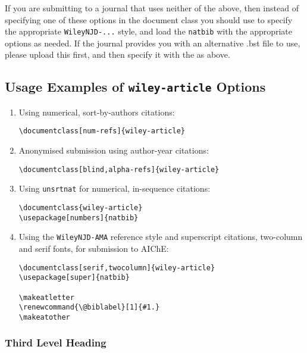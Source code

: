 If you are submitting to a journal that uses neither of the above, then instead of specifying one of these options in the document class you should use  \verb|| to specify the appropriate \verb|WileyNJD-...| style, and load the \verb|natbib| with the appropriate options as needed. If the journal provides you with an alternative .bst file to use, please upload this first, and then specify it with the \verb|| as above.

\subsection{Usage Examples of \texttt{wiley-article} Options}

\begin{enumerate}
       \item Using numerical, sort-by-authors citations:
             \begin{verbatim}
\documentclass[num-refs]{wiley-article}
\end{verbatim}

       \item Anonymised submission using author-year citations:
             \begin{verbatim}
\documentclass[blind,alpha-refs]{wiley-article}
\end{verbatim}

       \item Using \texttt{unsrtnat} for numerical, in-sequence citations:
             \begin{verbatim}
\documentclass{wiley-article}
\usepackage[numbers]{natbib}

\end{verbatim}

       \item Using the \texttt{WileyNJD-AMA} reference style and superscript citations, two-column and serif fonts, for submission to AIChE:

             \begin{verbatim}
\documentclass[serif,twocolumn]{wiley-article}
\usepackage[super]{natbib}

\makeatletter
\renewcommand{\@biblabel}[1]{#1.}
\makeatother
\end{verbatim}

\end{enumerate}

\subsubsection{Third Level Heading}

